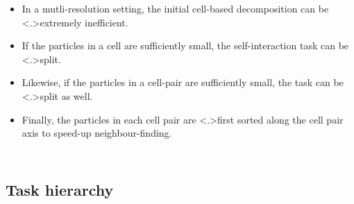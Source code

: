\documentclass{beamer}
\begin{document}
    
    \begin{frame}
    
        \begin{columns}
        
            \begin{itemize}
            
                \item<+-> In a mutli-resolution setting, the initial
                    cell-based decomposition can be \alert<.>{extremely
                    inefficient}.
                    
                \item<+-> If the particles in a cell 
                    are sufficiently small, the self-interaction task
                    can be \alert<.>{split}.
                    
                \item<+-> Likewise, if the particles in a cell-pair 
                    are sufficiently small, the task
                    can be \alert<.>{split} as well.
                    
                \item<+-> Finally, the particles in each cell pair are
                    \alert<.>{first sorted} along the cell pair axis to speed-up
                    neighbour-finding.

            \end{itemize}
            
         
        \end{columns}
    \end{frame}
    
    
    \subsection{Task hierarchy}
    
\end{document}
